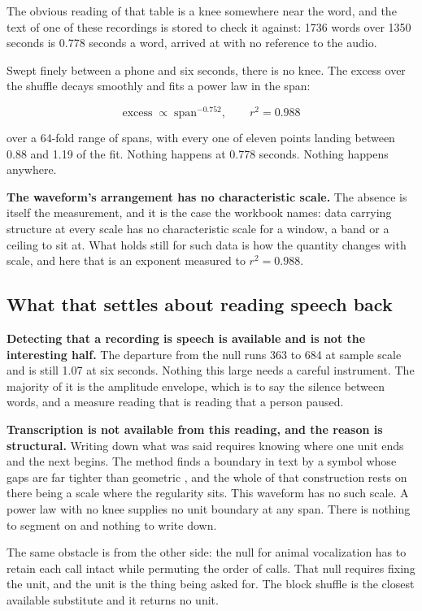 The obvious reading of that table is a knee somewhere near the word, and the text of one of these
recordings is stored to check it against: 1736 words over 1350 seconds is 0.778 seconds a word,
arrived at with no reference to the audio.

Swept finely between a phone and six seconds, there is no knee. The excess over the shuffle decays
smoothly and fits a power law in the span:

\[
\text{excess} \;\propto\; \text{span}^{-0.752}, \qquad r^2 = 0.988
\]

over a 64-fold range of spans, with every one of eleven points landing between 0.88 and 1.19 of the
fit. Nothing happens at 0.778 seconds. Nothing happens anywhere.

\textbf{The waveform's arrangement has no characteristic scale.} The absence is itself the
measurement, and it is the case the workbook names: data carrying structure at every scale has no
characteristic scale for a window, a band or a ceiling to sit at. What holds still for such data is
how the quantity changes with scale, and here that is an exponent measured to \(r^2 = 0.988\).

\subsection{What that settles about reading speech back}

\textbf{Detecting that a recording is speech is available and is not the interesting half.} The
departure from the null runs 363 to 684 at sample scale and is still 1.07 at six seconds. Nothing
this large needs a careful instrument. The majority of it is the amplitude envelope, which is to say the
silence between words, and a measure reading that is reading that a person paused.

\textbf{Transcription is not available from this reading, and the reason is structural.} Writing down
what was said requires knowing where one unit ends and the next begins. The method finds a boundary
in text by a symbol whose gaps are far tighter than geometric \cite{src:Quigg-delta-null}, and the
whole of that construction rests on there being a scale where the regularity sits. This waveform has
no such scale. A power law with no knee supplies no unit boundary at any span. There is nothing to
segment on and nothing to write down.

The same obstacle is from the other side: the null for animal vocalization has to retain each call
intact while permuting the order of calls. That null requires fixing the unit, and the unit is the
thing being asked for. The block shuffle is the closest available substitute and it returns no unit.

